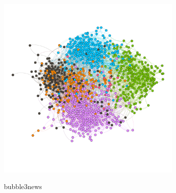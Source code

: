\begin{figure}
\begin{subfigure}[t]{0.35\textwidth}
    \includegraphics[width=\textwidth]{img/dim7_mod.pdf}
    \label{fig:bubble7mod}
    \caption{bubble3news}
  \end{subfigure}
  \\
  \begin{subfigure}[t]{0.25\textwidth}

\end{subfigure}
\end{figure}
